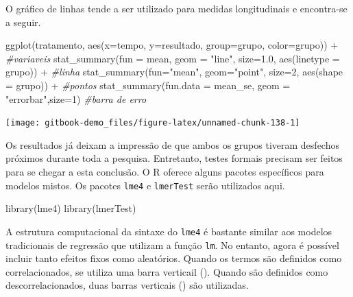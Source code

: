 \documentclass[
]{book}
\newenvironment{Shaded}{\begin{snugshade}}{\end{snugshade}}
\newcommand{\AttributeTok}[1]{\textcolor[rgb]{0.77,0.63,0.00}{#1}}
\newcommand{\CommentTok}[1]{\textcolor[rgb]{0.56,0.35,0.01}{\textit{#1}}}
\newcommand{\DecValTok}[1]{\textcolor[rgb]{0.00,0.00,0.81}{#1}}
\newcommand{\FloatTok}[1]{\textcolor[rgb]{0.00,0.00,0.81}{#1}}
\newcommand{\FunctionTok}[1]{\textcolor[rgb]{0.00,0.00,0.00}{#1}}
\newcommand{\NormalTok}[1]{#1}
\newcommand{\SpecialCharTok}[1]{\textcolor[rgb]{0.00,0.00,0.00}{#1}}
\newcommand{\StringTok}[1]{\textcolor[rgb]{0.31,0.60,0.02}{#1}}
\begin{document}
O gráfico de linhas tende a ser utilizado para medidas longitudinais e encontra-se a seguir.

\begin{Shaded}
\begin{Highlighting}[]
\FunctionTok{ggplot}\NormalTok{(tratamento, }\FunctionTok{aes}\NormalTok{(}\AttributeTok{x=}\NormalTok{tempo, }\AttributeTok{y=}\NormalTok{resultado, }
                       \AttributeTok{group=}\NormalTok{grupo, }\AttributeTok{color=}\NormalTok{grupo)) }\SpecialCharTok{+} \CommentTok{\#variaveis}
  \FunctionTok{stat\_summary}\NormalTok{(}\AttributeTok{fun =}\NormalTok{ mean, }\AttributeTok{geom =} \StringTok{"line"}\NormalTok{, }\AttributeTok{size=}\FloatTok{1.0}\NormalTok{, }
               \FunctionTok{aes}\NormalTok{(}\AttributeTok{linetype =}\NormalTok{ grupo)) }\SpecialCharTok{+} \CommentTok{\#linha}
  \FunctionTok{stat\_summary}\NormalTok{(}\AttributeTok{fun=}\StringTok{"mean"}\NormalTok{, }\AttributeTok{geom=}\StringTok{"point"}\NormalTok{, }\AttributeTok{size=}\DecValTok{2}\NormalTok{, }
               \FunctionTok{aes}\NormalTok{(}\AttributeTok{shape =}\NormalTok{ grupo)) }\SpecialCharTok{+} \CommentTok{\#pontos}
  \FunctionTok{stat\_summary}\NormalTok{(}\AttributeTok{fun.data =}\NormalTok{ mean\_se, }
               \AttributeTok{geom =} \StringTok{"errorbar"}\NormalTok{,}\AttributeTok{size=}\DecValTok{1}\NormalTok{) }\CommentTok{\#barra de erro}
\end{Highlighting}
\end{Shaded}

\begin{center}\texttt{[image: gitbook-demo\_files/figure-latex/unnamed-chunk-138-1]} \end{center}

Os resultados já deixam a impressão de que ambos os grupos tiveram desfechos próximos durante toda a pesquisa. Entretanto, testes formais precisam ser feitos para se chegar a esta conclusão. O R oferece alguns pacotes específicos para modelos mistos. Os pacotes \texttt{lme4} e \texttt{lmerTest} serão utilizados aqui.

\begin{Shaded}
\begin{Highlighting}[]
\FunctionTok{library}\NormalTok{(lme4)}
\FunctionTok{library}\NormalTok{(lmerTest)}
\end{Highlighting}
\end{Shaded}

A estrutura computacional da sintaxe do \texttt{lme4} é bastante similar aos modelos tradicionais de regressão que utilizam a função \texttt{lm}. No entanto, agora é possível incluir tanto efeitos fixos como aleatórios. Quando os termos são definidos como correlacionados, se utiliza uma barra verticail (\textbar). Quando são definidos como descorrelacionados, duas barras verticais (\textbar\textbar) são utilizadas.
\end{document}
